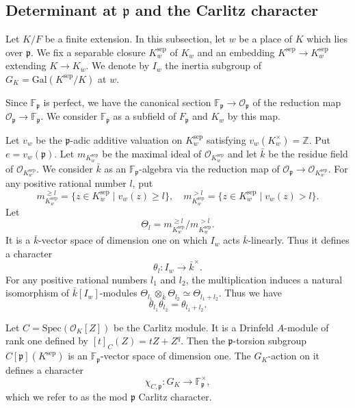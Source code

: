 \documentclass[10pt]{amsart}
\theoremstyle{plain}
\theoremstyle{definition}
\newcommand{\Gal}{\mathrm{Gal}}
\newcommand{\sep}{\mathrm{sep}}
\newcommand{\Spec}{\mathrm{Spec}}
\newcommand{\cO}{\mathcal{O}}
\newcommand{\bF}{\mathbb{F}}
\newcommand{\bZ}{\mathbb{Z}}
\newcommand{\frp}{\mathfrak{p}}
\begin{document}
\subsection{Determinant at $\frp$ and the Carlitz character}\label{SubsecDetCarlitz}

Let $K/F$ be a finite extension.
In this subsection, let $w$ be a place of $K$ which lies over $\frp$. 
We fix a separable closure $K^\sep_w$ of $K_w$ and an embedding $K^\sep\to K_w^\sep$ extending $K\to K_w$.
We denote by $I_w$ the inertia subgroup of $G_K=\Gal(K^\sep/K)$ at $w$. 

Since $\bF_\frp$ is perfect, we have the canonical section $\bF_\frp\to\cO_\frp$ of the reduction map
$\cO_\frp\to \bF_\frp$.
We consider $\bF_\frp$ as a subfield of $F_\frp$ and $K_w$ by this map.


Let $v_w$ be the $\frp$-adic additive valuation on $K_w^\sep$ satisfying $v_{w}(K_w^\times)=\bZ$.
Put $e=v_w(\frp)$. Let $m_{K_w^\sep}$ be the maximal ideal of $\cO_{K_w^\sep}$ and
let $\bar{k}$ be the residue field of $\cO_{K_w^\sep}$. 
We consider $\bar{k}$ as an $\bF_\frp$-algebra via the reduction map of $\cO_\frp\to \cO_{K_w^\sep}$.
For any positive rational number $l$, put
\[
m_{K_w^\sep}^{\geqslant l}=\{z\in K_w^\sep\mid v_w(z)\geq l\},\quad m_{K_w^\sep}^{> l}=\{z\in K_w^\sep\mid v_w(z)> l\}.
\]
Let
\[
\Theta_l=m_{K_w^\sep}^{\geqslant l}/m_{K_w^\sep}^{>l}.
\]
It is a $\bar{k}$-vector space of dimension one on which $I_w$ acts $\bar{k}$-linearly.
Thus it defines a character
\[
\theta_l:I_w\to \bar{k}^\times.
\]
For any positive rational numbers $l_1$ and $l_2$, the multiplication induces a natural isomorphism of $\bar{k}[I_w]$-modules
$\Theta_{l_1}\otimes_{\bar{k}} \Theta_{l_2}\simeq \Theta_{l_1+l_2}$. Thus we have
\begin{equation}\label{EqnGradedPieceProd}
	\theta_{l_1}\theta_{l_2}=\theta_{l_1+l_2}.
\end{equation}



Let $C=\Spec(\cO_K[Z])$ be the Carlitz module. It is a Drinfeld $A$-module of rank one defined by $[t]_C(Z)=tZ+Z^q$.
Then the $\frp$-torsion subgroup $C[\frp](K^\sep)$ is an $\bF_\frp$-vector space of dimension one. The $G_K$-action on it 
defines a character
\[
\chi_{C,\frp}:G_K\to \bF_\frp^\times,
\]
which we refer to as the mod $\frp$ Carlitz character.
\end{document}
